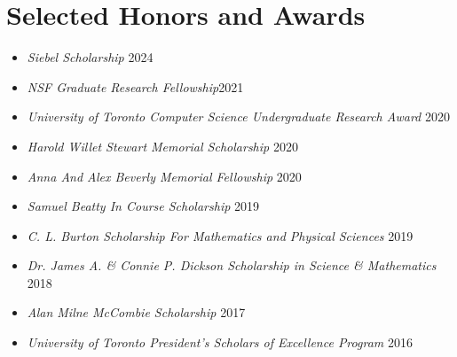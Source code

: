 \documentclass{article}
\begin{document}
    \section{Selected Honors and  Awards}
    \begin{itemize}
     \setlength\itemsep{.4ex}
     	\item \textsl{Siebel Scholarship} \hfill 2024
     	\item \textsl{NSF Graduate Research Fellowship}\hfill 2021
        \item \textsl{University of Toronto Computer Science Undergraduate Research Award} \hfill 2020
        \item \textsl{Harold Willet Stewart Memorial Scholarship} \hfill 2020
        \item \textsl{Anna And Alex Beverly Memorial Fellowship} \hfill 2020
        \item \textsl{Samuel Beatty In Course Scholarship} \hfill 2019
        \item \textsl{C. L. Burton Scholarship For Mathematics and Physical Sciences} \hfill 2019
        \item \textsl{Dr. James A. \& Connie P. Dickson Scholarship in Science \& Mathematics} \hfill 2018
        \item \textsl{Alan Milne McCombie Scholarship} \hfill 2017
        \item \textsl{University of Toronto President's Scholars of Excellence Program} \hfill 2016
    \end{itemize}
\end{document}
